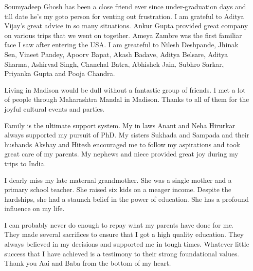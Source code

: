 Soumyadeep Ghosh has been a close friend ever since under-graduation days and till date he's my goto person for venting out frustration. 
I am grateful to Aditya Vijay's great advice in so many situations.
Ankur Gupta provided great company on various trips that we went on together.
Ameya Zambre was the first familiar face I saw after entering the USA. 
I am greateful to Nilesh Deshpande, Jhinak Sen, Vineet Pandey, Apoorv Bapat, Akash Badave, Aditya Belsare, Aditya Sharma, Ashirvad Singh, Chanchal Batra, Abhishek Jain, Subhro Sarkar, Priyanka Gupta and Pooja Chandra.


Living in Madison would be dull without a fantastic group of friends.
I met a lot of people through Maharashtra Mandal in Madison.
Thanks to all of them for the joyful cultural events and parties.

Family is the ultimate support system. 
My in laws Anant and Neha Hirurkar always supported my pursuit of PhD. 
My sisters Sukhada and Sampada and their husbands Akshay and Hitesh encouraged me to follow my aspirations and took great care of my parents.
My nephews and niece provided great joy during my trips to India.

I dearly miss my late maternal grandmother. 
She was a single mother and a primary school teacher.
She raised six kids on a meager income.
Despite the hardships, she had a staunch belief in the power of education.
She has a profound influence on my life.

I can probably never do enough to repay what my parents have done for me. 
They made several sacrifices to ensure that I got a high quality education. 
They always believed in my decisions and supported me in tough times.
Whatever little success that I have achieved is a testimony to their strong foundational values.
Thank you Aai and Baba from the bottom of my heart.

